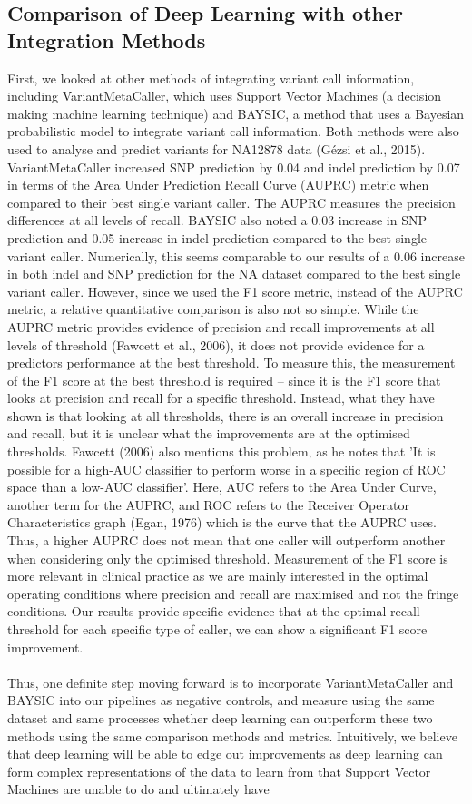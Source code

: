 \documentclass{article}
\begin{document}
\subsection{Comparison of Deep Learning with other Integration Methods}
First, we looked at other methods of integrating variant call information, including VariantMetaCaller, which uses Support Vector Machines (a decision making machine learning technique) and BAYSIC, a method that uses a Bayesian probabilistic model to integrate variant call information. Both methods were also used to analyse and predict variants for NA12878 data (Gézsi et al., 2015). VariantMetaCaller increased SNP prediction by 0.04 and indel prediction by 0.07 in terms of the Area Under Prediction Recall Curve (AUPRC) metric when compared to their best single variant caller. The AUPRC measures the precision differences at all levels of recall. BAYSIC also noted a 0.03 increase in SNP prediction and 0.05 increase in indel prediction compared to the best single variant caller. Numerically, this seems comparable to our results of a 0.06 increase in both indel and SNP prediction for the NA dataset compared to the best single variant caller. However, since we used the F1 score metric, instead of the AUPRC metric, a relative quantitative comparison is also not so simple. While the AUPRC metric provides evidence of precision and recall improvements at all levels of threshold (Fawcett et al., 2006), it does not provide evidence for a predictors performance at the best threshold. To measure this, the measurement of the F1 score at the best threshold is required -- since it is the F1 score that looks at precision and recall for a specific threshold. Instead, what they have shown is that looking at all thresholds, there is an overall increase in precision and recall, but it is unclear what the improvements are at the optimised thresholds. Fawcett (2006) also mentions this problem, as he notes that 'It is possible for a high-AUC classifier to perform worse in a specific region of ROC space than a low-AUC classifier'. Here, AUC refers to the Area Under Curve, another term for the AUPRC, and ROC refers to the Receiver Operator Characteristics graph (Egan, 1976) which is the curve that the AUPRC uses. Thus, a higher AUPRC does not mean that one caller will outperform another when considering only the optimised threshold.  Measurement of the F1 score is more relevant in clinical practice as we are mainly interested in the optimal operating conditions where precision and recall are maximised and not the fringe conditions. Our results provide specific evidence that at the optimal recall threshold for each specific type of caller, we can show a significant F1 score improvement. \\\\ Thus, one definite step moving forward is to incorporate VariantMetaCaller and BAYSIC into our pipelines as negative controls, and measure using the same dataset and same processes whether deep learning can outperform these two methods using the same comparison methods and metrics. Intuitively, we believe that deep learning will be able to edge out improvements as deep learning can form complex representations of the data to learn from that Support Vector Machines are unable to do and ultimately have 
\end{document}
